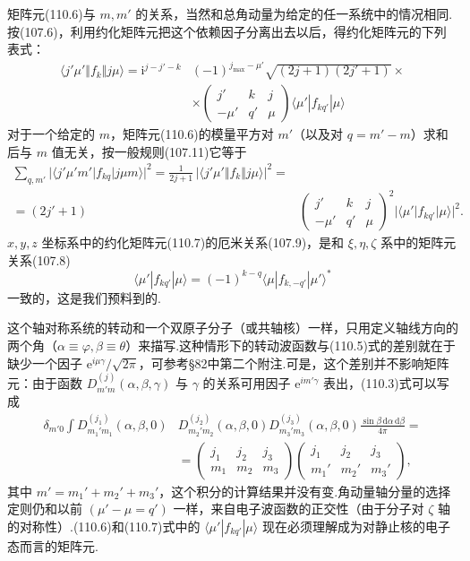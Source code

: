 矩阵元(110.6)与 $m,m'$ 的关系，当然和总角动量为给定的任一系统中的情况相同.按(107.6)，利用约化矩阵元把这个依赖因子分离出去以后，得约化矩阵元的下列表式：
\begin{equation}
\begin{aligned}
  \langle j'\mu'\Vert f_k\Vert j\mu\rangle
  =\mathrm{i}^{j-j'-k}&(-1)^{j_{\max}-\mu'}\sqrt{(2j+1)(2j'+1)}\times\\
  &\times\left(\begin{array}{ccc}j'&k&j\\-\mu'&q'&\mu\end{array}\right)
  \langle\mu'|f_{kq'}|\mu\rangle
\end{aligned}
\end{equation}
对于一个给定的 $m$，矩阵元(110.6)的模量平方对 $m'$（以及对 $q=m'-m$）求和后与 $m$ 值无关，按一般规则(107.11)它等于
\begin{equation}
\begin{aligned}
  \sum_{q,m'}|\langle j'\mu'm'|f_{kq}|j\mu m\rangle|^2
  =\frac{1}{2j+1}\,|\langle j'\mu'\Vert f_k\Vert j\mu\rangle|^2=\\
  =(2j'+1)&\left(\begin{array}{ccc}j'&k&j\\-\mu'&q'&\mu\end{array}\right)^{\!2}
  |\langle\mu'|f_{kq'}|\mu\rangle|^2.
\end{aligned}
\end{equation}
$x,y,z$ 坐标系中的约化矩阵元(110.7)的厄米关系(107.9)，是和 $\xi,\eta,\zeta$ 系中的矩阵元关系(107.8)
\begin{equation*}
  \langle\mu'|f_{kq'}|\mu\rangle
  =(-1)^{k-q}\langle\mu|f_{k,-q'}|\mu'\rangle^{*}
\end{equation*}
一致的，这是我们预料到的.

这个轴对称系统的转动和一个双原子分子（或共轴核）一样，只用定义轴线方向的两个角（$\alpha\equiv\varphi,\beta\equiv\theta$）来描写.这种情形下的转动波函数与(110.5)式的差别就在于缺少一个因子 $\mathrm{e}^{i\mu\gamma}/\sqrt{2\pi}$，可参考§82中第二个附注.可是，这个差别并不影响矩阵元：由于函数 $D^{(j)}_{m'm}(\alpha,\beta,\gamma)$ 与 $\gamma$ 的关系可用因子 $\mathrm{e}^{im'\gamma}$ 表出，(110.3)式可以写成
\begin{equation*}
\begin{aligned}
  \delta_{m'0}\int D^{(j_1)}_{m_1'm_1}(\alpha,\beta,0)
  &D^{(j_2)}_{m_2'm_2}(\alpha,\beta,0)
  D^{(j_3)}_{m_3'm_3}(\alpha,\beta,0)
  \frac{\sin\beta\,\mathrm{d}\alpha\,\mathrm{d}\beta}{4\pi}=\\
  &=\left(\begin{array}{ccc}j_1&j_2&j_3\\m_1&m_2&m_3\end{array}\right)
  \left(\begin{array}{ccc}j_1&j_2&j_3\\m_1'&m_2'&m_3'\end{array}\right),
\end{aligned}
\end{equation*}
其中 $m'=m_1'+m_2'+m_3'$，这个积分的计算结果并没有变.角动量轴分量的选择定则仍和以前 $(\mu'-\mu=q')$ 一样，来自电子波函数的正交性（由于分子对 $\zeta$ 轴的对称性）.(110.6)和(110.7)式中的 $\langle\mu'|f_{kq'}|\mu\rangle$ 现在必须理解成为对静止核的电子态而言的矩阵元.
